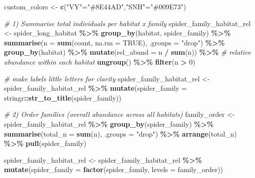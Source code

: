\documentclass[
]{article}
\newenvironment{Shaded}{\begin{snugshade}}{\end{snugshade}}
\newcommand{\AttributeTok}[1]{\textcolor[rgb]{0.13,0.29,0.53}{#1}}
\newcommand{\CommentTok}[1]{\textcolor[rgb]{0.56,0.35,0.01}{\textit{#1}}}
\newcommand{\ConstantTok}[1]{\textcolor[rgb]{0.56,0.35,0.01}{#1}}
\newcommand{\DecValTok}[1]{\textcolor[rgb]{0.00,0.00,0.81}{#1}}
\newcommand{\FunctionTok}[1]{\textcolor[rgb]{0.13,0.29,0.53}{\textbf{#1}}}
\newcommand{\NormalTok}[1]{#1}
\newcommand{\OtherTok}[1]{\textcolor[rgb]{0.56,0.35,0.01}{#1}}
\newcommand{\SpecialCharTok}[1]{\textcolor[rgb]{0.81,0.36,0.00}{\textbf{#1}}}
\newcommand{\StringTok}[1]{\textcolor[rgb]{0.31,0.60,0.02}{#1}}
\begin{document}
\begin{Shaded}
\begin{Highlighting}[]
\NormalTok{custom\_colors }\OtherTok{\textless{}{-}} \FunctionTok{c}\NormalTok{(}\StringTok{"VY"}\OtherTok{=}\StringTok{"\#8E44AD"}\NormalTok{,}\StringTok{"SNH"}\OtherTok{=}\StringTok{"\#009E73"}\NormalTok{)}

\CommentTok{\# 1) Summarise total individuals per habitat x family}
\NormalTok{spider\_family\_habitat\_rel }\OtherTok{\textless{}{-}}\NormalTok{ spider\_long\_habitat }\SpecialCharTok{\%\textgreater{}\%}
  \FunctionTok{group\_by}\NormalTok{(habitat, spider\_family) }\SpecialCharTok{\%\textgreater{}\%}
  \FunctionTok{summarise}\NormalTok{(}\AttributeTok{n =} \FunctionTok{sum}\NormalTok{(count, }\AttributeTok{na.rm =} \ConstantTok{TRUE}\NormalTok{), }\AttributeTok{.groups =} \StringTok{"drop"}\NormalTok{) }\SpecialCharTok{\%\textgreater{}\%}
  \FunctionTok{group\_by}\NormalTok{(habitat) }\SpecialCharTok{\%\textgreater{}\%}
  \FunctionTok{mutate}\NormalTok{(}\AttributeTok{rel\_abund =}\NormalTok{ n }\SpecialCharTok{/} \FunctionTok{sum}\NormalTok{(n)) }\SpecialCharTok{\%\textgreater{}\%}   \CommentTok{\# relative abundance within each habitat}
  \FunctionTok{ungroup}\NormalTok{() }\SpecialCharTok{\%\textgreater{}\%}
  \FunctionTok{filter}\NormalTok{(n }\SpecialCharTok{\textgreater{}} \DecValTok{0}\NormalTok{)}


\CommentTok{\# make labels little letters for clarity}
\NormalTok{spider\_family\_habitat\_rel }\OtherTok{\textless{}{-}}\NormalTok{ spider\_family\_habitat\_rel }\SpecialCharTok{\%\textgreater{}\%}
  \FunctionTok{mutate}\NormalTok{(}\AttributeTok{spider\_family =}\NormalTok{ stringr}\SpecialCharTok{::}\FunctionTok{str\_to\_title}\NormalTok{(spider\_family))}

\CommentTok{\# 2) Order families (overall abundance across all habitats)}
\NormalTok{family\_order }\OtherTok{\textless{}{-}}\NormalTok{ spider\_family\_habitat\_rel }\SpecialCharTok{\%\textgreater{}\%}
  \FunctionTok{group\_by}\NormalTok{(spider\_family) }\SpecialCharTok{\%\textgreater{}\%}
  \FunctionTok{summarise}\NormalTok{(}\AttributeTok{total\_n =} \FunctionTok{sum}\NormalTok{(n), }\AttributeTok{.groups =} \StringTok{"drop"}\NormalTok{) }\SpecialCharTok{\%\textgreater{}\%}
  \FunctionTok{arrange}\NormalTok{(total\_n) }\SpecialCharTok{\%\textgreater{}\%}
  \FunctionTok{pull}\NormalTok{(spider\_family)}

\NormalTok{spider\_family\_habitat\_rel }\OtherTok{\textless{}{-}}\NormalTok{ spider\_family\_habitat\_rel }\SpecialCharTok{\%\textgreater{}\%}
  \FunctionTok{mutate}\NormalTok{(}\AttributeTok{spider\_family =} \FunctionTok{factor}\NormalTok{(spider\_family, }\AttributeTok{levels =}\NormalTok{ family\_order))}



\end{Highlighting}
\end{Shaded}
\end{document}
